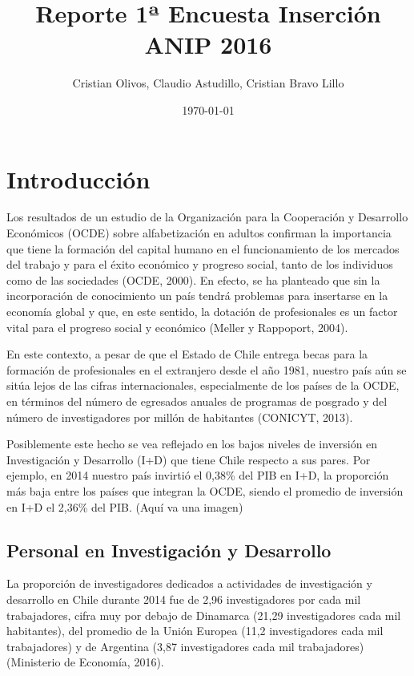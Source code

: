\documentclass{article}
\title{Reporte 1ª Encuesta Inserción ANIP 2016}
\author{Cristian Olivos, Claudio Astudillo, Cristian Bravo Lillo}
\date{\today}
\begin{document}
\maketitle
\tableofcontents

\section{Introducción}

Los resultados de un estudio de la Organización para la Cooperación y Desarrollo Económicos (OCDE) sobre alfabetización en adultos confirman la importancia que tiene la formación del capital humano en el funcionamiento de los mercados del trabajo y para el éxito económico y progreso social, tanto de los individuos como de las sociedades (OCDE, 2000). En efecto, se ha planteado que sin la incorporación de conocimiento un país tendrá problemas para insertarse en la economía global y que, en este sentido, la dotación de profesionales es un factor vital para el progreso social y económico (Meller y Rappoport, 2004).

En este contexto, a pesar de que el Estado de Chile entrega becas para la formación de profesionales en el extranjero desde el año 1981, nuestro país aún se sitúa lejos de las cifras internacionales, especialmente de los países de la OCDE, en términos del número de egresados anuales de programas de posgrado y del número de investigadores por millón de habitantes (CONICYT, 2013).

Posiblemente este hecho se vea reflejado en los bajos niveles de inversión en Investigación y Desarrollo  (I+D) que tiene Chile respecto a sus pares. Por ejemplo, en 2014 nuestro país invirtió el 0,38\% del PIB en I+D, la proporción más baja entre los países que integran la OCDE, siendo el promedio de inversión en I+D el 2,36\% del PIB.
(Aquí va una imagen)

\subsection{Personal en Investigación y Desarrollo}

La proporción de investigadores  dedicados a actividades de investigación y desarrollo en Chile durante 2014 fue de 2,96 investigadores por cada mil trabajadores, cifra muy por debajo de Dinamarca (21,29 investigadores cada mil habitantes), del promedio de la Unión Europea (11,2 investigadores cada mil trabajadores) y de Argentina (3,87 investigadores cada mil trabajadores) (Ministerio de Economía, 2016).
\end{document}
